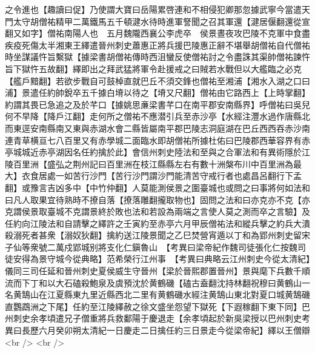 之令進也【趣讀曰促】乃使謂大寶曰岳陽累啓連和不相侵犯卿那忽據武寧今當遣天門太守胡僧祐精甲二萬鐵馬五千頓湕水待時進軍詧聞之召其軍還【湕居偃翻還從宣翻又如字】僧祐南陽人也　五月魏隴西襄公李虎卒　侯景晝夜攻巴陵不克軍中食盡疾疫死傷太半湘東王繹遣晉州刺史蕭惠正將兵援巴陵惠正辭不堪舉胡僧祐自代僧祐時坐謀議忤旨繫獄【據梁書胡僧祐傳時西沮蠻反使僧祐討之令盡誅其渠帥僧祐諫忤旨下獄忤五故翻】繹即出之拜武猛將軍令赴援戒之曰賊若水戰但以大艦臨之必克【艦戶黯翻】若欲步戰自可鼓棹直就巴丘不須交鋒也僧祐至湘浦【湘水入湖之口曰浦】景遣任約帥銳卒五千據白塉以待之【塉又尺翻】僧祐由它路西上【上時掌翻】約謂其畏已急追之及於芊口【據姚思亷梁書芊口在南平郡安南縣界】呼僧祐曰吳兒何不早降【降戶江翻】走何所之僧祐不應潜引兵至赤沙亭【水經注灃水過作唐縣北而東逕安南縣南又東與赤湖水會二縣皆屬南平郡巴陵志洞庭湖在巴丘西西吞赤沙南連青草横亘七八百里又有赤學城二面臨水即胡僧祐所據杜佑曰巴陵郡西華容界有赤亭城城近赤亭湖因名任約擒於此】會信州刺史陸法和至與之合軍法和有異術隱於江陵百里洲【盛弘之荆州記曰百里洲在枝江縣縣左右有數十洲槃布川中百里洲為最大】衣食居處一如苦行沙門【苦行沙門謂沙門能清苦守戒行者也處昌呂翻行下孟翻】或豫言吉凶多中【中竹仲翻】人莫能測侯景之圍臺城也或問之曰事將何如法和曰凡人取果宜待熟時不撩自落【撩落雕翻攏取物也】固問之法和曰亦克亦不克【亦克謂侯景取臺城不克謂景終於敗也法和若設為兩端之言使人莫之測而卒之言驗】及任約向江陵法和自請擊之繹許之壬寅約至赤亭六月甲辰僧祐法和縱兵擊之約兵大潰殺溺死者甚衆【溺奴狄翻】擒約送江陵景聞之乙巳焚營宵遁以丁和為郢州刺史留宋子仙等衆號二萬戍郢城别將支化仁鎭魯山　【考異曰梁帝紀作魏司徒張化仁按魏司徒安得為景守城今從典略】范希榮行江州事　【考異曰典略云江州刺史今從太清紀】儀同三司任延和晉州刺史夏侯威生守晉州【梁於晉熙郡置晉州】景與麾下兵數千順流而下丁和以大石磕殺鮑泉及虞預沈於黄鶴磯【磕古盍翻沈持林翻祝穆曰黄鶴山一名黄鵠山在江夏縣東九里近縣西北二里有黄鶴磯水經注黄鵠山東北對夏口城黄鵠磯直鸚鵡洲之下尾】任約至江陵繹赦之徐文盛坐怨望下獄死【下遐稼翻下東下同】巴州刺史余孝頃遣兄子僧重將兵救鄱陽于慶退走【余孝頃起於新吳梁授以巴州刺史考異曰長歷六月癸卯朔太清紀一日慶走二日擒任約三日景走今從梁帝紀】繹以王僧辯<br />
<br />
